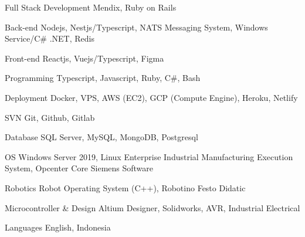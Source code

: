 

\begin{cvskills}
  \cvskill
    {Full Stack Development} %
    {Mendix, Ruby on Rails} %

  \cvskill
    {Back-end} %
    {Nodejs, Nestjs/Typescript, NATS Messaging System, Windows Service/C\# .NET, Redis} %

  \cvskill
    {Front-end} %
    {Reactjs, Vuejs/Typescript, Figma} %

  \cvskill
    {Programming} %
    {Typescript, Javascript, Ruby, C\#, Bash} %

  \cvskill
    {Deployment} %
    {Docker, VPS, AWS (EC2), GCP (Compute Engine), Heroku, Netlify } %

  \cvskill
    {SVN} %
    {Git, Github, Gitlab} %

  \cvskill
    {Database} %
    {SQL Server, MySQL, MongoDB, Postgresql} %

  \cvskill
    {OS} %
    {Windows Server 2019, Linux} %
  \cvskill
    {Enterprise Industrial} %
    {Manufacturing Execution System, Opcenter Core Siemens Software} %

  \cvskill
    {Robotics} %
    {Robot Operating System (C++), Robotino Festo Didatic} %


  \cvskill
    {Microcontroller \& Design} %
    {Altium Designer, Solidworks, AVR, Industrial Electrical} %

  \cvskill
  {Languages} %
  {English, Indonesia} %

\end{cvskills}
